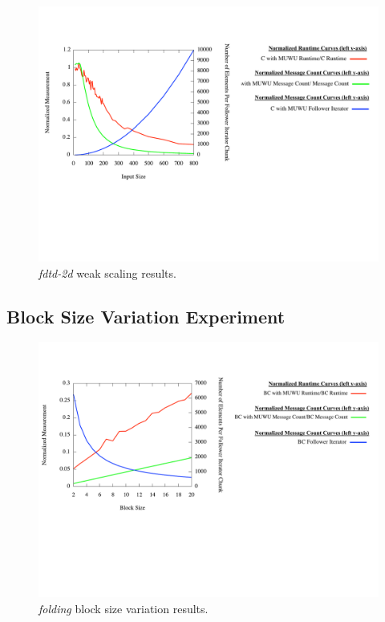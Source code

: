 \begin{figure}
\begin{center}
\includegraphics[width=\linewidth]{./Figures/input_variation_exp/fdtd2d.pdf}
\caption{\textit{fdtd-2d} weak scaling results.}
\label{fdtd-2d_weak_scaling}
\end{center}
\end{figure}

\subsection{Block Size Variation Experiment}\label{subsec:blocksize_variation}

\begin{figure}
\begin{center}
\includegraphics[width=\linewidth]{./Figures/blocksize_variation_exp/pascal.pdf}
\caption{\textit{folding} block size variation results.}
\label{folding_blocksize_scaling}
\end{center}
\end{figure}

